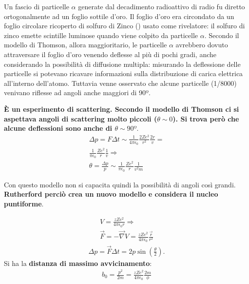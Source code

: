 \documentclass[a4paper,11pt,twoside,openany]{book}
\theoremstyle{definition}
\theoremstyle{plain}
\theoremstyle{plain}
\theoremstyle{definition}
\begin{document}
Un fascio di particelle $\alpha$ generate dal decadimento radioattivo di radio fu diretto ortogonalmente ad un foglio sottile d'oro. Il foglio d'oro era circondato da un foglio circolare ricoperto di solfuro di Zinco () usato come rivelatore: il solfuro di zinco emette scintille luminose quando viene colpito da particelle $\alpha$.
Secondo il modello di Thomson, allora maggioritario, le particelle $\alpha$ avrebbero dovuto attraversare il foglio d'oro venendo deflesse al più di pochi gradi, anche considerando la possibilità di diffusione multipla: misurando la deflessione delle particelle si potevano ricavare informazioni sulla distribuzione di carica elettrica all'interno dell'atomo. Tuttavia venne osservato che alcune particelle (1/8000) venivano riflesse ad angoli anche maggiori di 90º. 

\textbf{È un esperimento di scattering. Secondo il modello di Thomson ci si aspettava angoli di scattering molto piccoli ($\theta \sim 0$). Si trova però che alcune deflessioni sono anche di $\theta \sim 90º$}.
\begin{equation}\begin{split}
\Delta p=F \Delta t\sim \frac{1}{4\pi \epsilon _0}\frac{2Ze^2}{r^2}\frac{2r}{v}=\\
\frac{1}{\pi \epsilon _0}\frac{Ze^2}{r}\frac{1}{v} \Longrightarrow \\
\theta =\frac{\Delta p}{p}\sim \frac{1}{\pi \epsilon _0}\frac{Ze^2}{r}\frac{1}{v^2m}
\end{split}\end{equation}

Con questo modello non si capacita quindi la possibilità di angoli così grandi. \textbf{Rutherford perciò crea un nuovo modello e considera il nucleo puntiforme}.

\begin{equation}\begin{split}
V=\frac{zZe^2}{4\pi \epsilon _0r} \Longrightarrow \\
\vec F=-\vec \nabla V=\frac{zZe^2}{4\pi \epsilon _0}\frac{\vec r}{r^2}
\end{split}\end{equation}
\begin{equation}\begin{split}
\Delta p=\vec F\Delta t=2p\sin{\left(\frac{\theta }{2}\right)}.
\end{split}\end{equation}
Si ha la \textbf{distanza di massimo avvicinamento}:
\begin{equation}\begin{split}
b_0=\frac{p^2}{2m}=\frac{zZe^2}{4\pi \epsilon _0}\frac{2m}{\phi }
\end{split}\end{equation}
\end{document}
